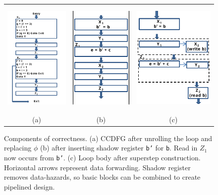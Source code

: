 \begin{figure}
\begin{center}
\begin{tabular}{ccc}
\includegraphics[height=2.2in]
{fig/phi-removal}
&
\includegraphics[height=2.2in]{fig/revised_seq_ccdfg_after_adding_shadow_registers}
&
\includegraphics[height=2.2in]{fig/revised_seq_ccdfg_after_interchange}
\\
(a) & (b) & (c)
\end{tabular}
\end{center}
\caption{Components of correctness.  (a) CCDFG after unrolling the loop and replacing $\phi$ (b) after inserting
  shadow register {\tt b'} for {\tt b}. Read in
  $Z_{1}$ now occurs from {\tt b'}.  (c) Loop body
  after superstep construction.  Horizontal arrows represent
  data forwarding. Shadow register removes data-hazards, so basic blocks can be combined to create pipelined design.}
\label{fig:correctness}
\end{figure}


